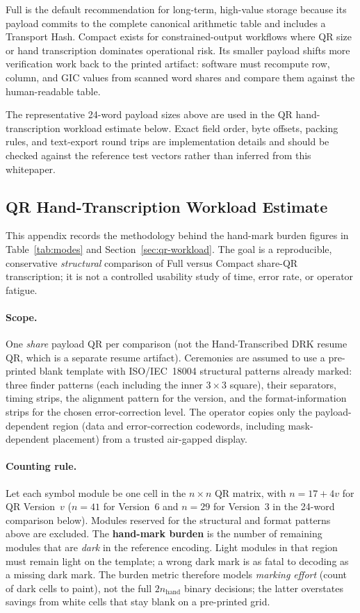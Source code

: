 \documentclass[11pt]{article}
\begin{document}
Full is the default recommendation for long-term, high-value storage because its payload commits to the complete canonical arithmetic table and includes a Transport Hash. Compact exists for constrained-output workflows where QR size or hand transcription dominates operational risk. Its smaller payload shifts more verification work back to the printed artifact: software must recompute row, column, and GIC values from scanned word shares and compare them against the human-readable table.

The representative 24-word payload sizes above are used in the QR hand-transcription workload estimate below. Exact field order, byte offsets, packing rules, and text-export round trips are implementation details and should be checked against the reference test vectors rather than inferred from this whitepaper.

\subsection{QR Hand-Transcription Workload Estimate}
\label{app:qr-workload}

This appendix records the methodology behind the hand-mark burden figures in Table~\ref{tab:modes} and Section~\ref{sec:qr-workload}. The goal is a reproducible, conservative \emph{structural} comparison of Full versus Compact share-QR transcription; it is not a controlled usability study of time, error rate, or operator fatigue.

\paragraph{Scope.} One \emph{share} payload QR per comparison (not the Hand-Transcribed DRK resume QR, which is a separate resume artifact). Ceremonies are assumed to use a pre-printed blank template with ISO/IEC~18004 structural patterns already marked: three finder patterns (each including the inner $3\times 3$ square), their separators, timing strips, the alignment pattern for the version, and the format-information strips for the chosen error-correction level. The operator copies only the payload-dependent region (data and error-correction codewords, including mask-dependent placement) from a trusted air-gapped display.

\paragraph{Counting rule.} Let each symbol module be one cell in the $n\times n$ QR matrix, with $n=17+4v$ for QR Version~$v$ ($n=41$ for Version~6 and $n=29$ for Version~3 in the 24-word comparison below). Modules reserved for the structural and format patterns above are excluded. The \textbf{hand-mark burden} is the number of remaining modules that are \emph{dark} in the reference encoding. Light modules in that region must remain light on the template; a wrong dark mark is as fatal to decoding as a missing dark mark. The burden metric therefore models \emph{marking effort} (count of dark cells to paint), not the full $2n_{\text{hand}}$ binary decisions; the latter overstates savings from white cells that stay blank on a pre-printed grid.
\end{document}
